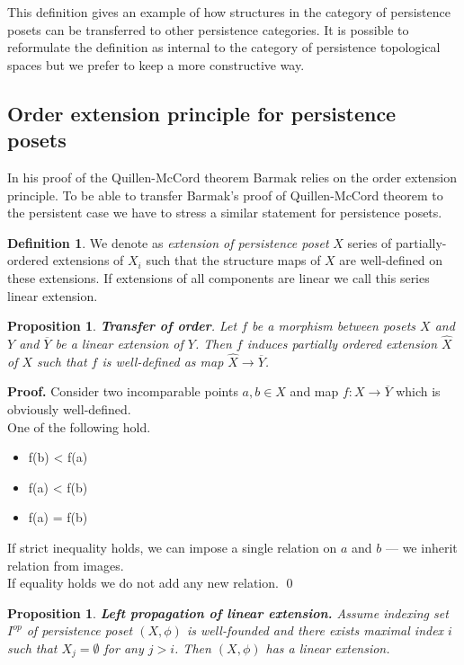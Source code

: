 \documentclass[a4paper, 12pt]{article}
\newcounter{stmcounter}[section]
\numberwithin{equation}{section}
\newtheorem{proposition}[stmcounter]{Proposition}
\theoremstyle{definition}
\newtheorem{definition}[stmcounter]{Definition}
\theoremstyle{remark}
\newenvironment{pf}{\noindent\textbf{Proof.}}{\qed}
\newcommand{\define}[1]{{\textit{#1}}}
\begin{document}
This definition gives an example of how structures in the category of persistence posets can be transferred to other persistence categories. It is possible to reformulate the definition as internal to the category of persistence topological spaces but we prefer to keep a more constructive way.


\subsection{Order extension principle for persistence posets}

In his proof of the Quillen-McCord theorem Barmak relies on the order extension principle. To be able to transfer Barmak's proof of Quillen-McCord theorem to the persistent case we have to stress a similar statement for persistence posets.

\begin{definition}
  We denote as \define{extension of persistence poset} $X$ series of partially-ordered extensions of $X_i$ such that the structure maps of $X$ are well-defined on these extensions. If extensions of all components are linear we call this series linear extension.
\end{definition}

\begin{proposition}
  \textbf{Transfer of order}. Let $f$ be a morphism between posets $X$ and $Y$ and $\overline{Y}$ be a linear extension of $Y$. Then $f$ induces partially ordered extension $\hat{X}$ of $X$ such that $f$ is well-defined as map $\hat{X} \to \overline{Y}$.
\end{proposition}

\begin{pf}
  Consider two incomparable points $a, b \in X$ and map $f : X \to \overline{Y}$ which is obviously well-defined.\\
  One of the following hold.\\
  \begin{itemize}
    \item f(b) < f(a)
    \item f(a) < f(b)
    \item f(a) = f(b)
  \end{itemize}
  If strict inequality holds, we can impose a single relation on $a$ and $b$ --- we inherit relation from images.\\
  If equality holds we do not add any new relation.
\end{pf}

\begin{proposition}
  \textbf{Left propagation of linear extension.} Assume indexing set $I^{op}$ of persistence poset $(X,\phi)$ is well-founded and there exists maximal index $i$ such that $X_j = \emptyset$ for any $j > i$. Then $(X,\phi)$ has a linear extension.
\end{proposition}
\end{document}
